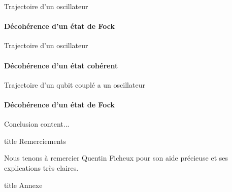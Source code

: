 \documentclass[11pt]{beamer}
\begin{document}
\begin{frame}{Trajectoire d'un oscillateur}
\framesubtitle{Décohérence d'un état de Fock}
\end{frame}

\begin{frame}{Trajectoire d'un oscillateur}
\framesubtitle{Décohérence d'un état cohérent}
\end{frame}


\begin{frame}{Trajectoire d'un qubit couplé a un oscillateur}
\framesubtitle{Décohérence d'un état de Fock}
\end{frame}

\begin{frame}{Conclusion}
content...
\end{frame}

\begin{frame}[plain]
\begin{beamercolorbox}[sep=8pt,center]{title}
Remerciements%
\end{beamercolorbox}
\centering
Nous tenons à remercier Quentin Ficheux pour son aide précieuse et ses explications très claires. %

\end{frame}

\appendix
{}

\begin{frame}
\vfill
\begin{beamercolorbox}[sep=8pt,center]{title}
Annexe
\end{beamercolorbox}
\vfill
\end{frame}
\end{document}
